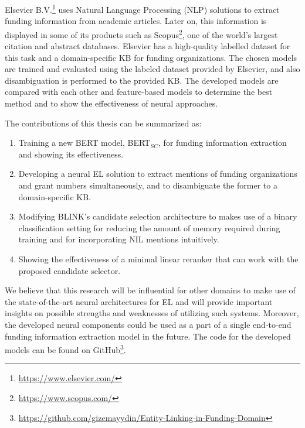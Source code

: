\documentclass{report}
\theoremstyle{definition}
\theoremstyle{remark}
\begin{document}
Elsevier B.V.\footnote{\url{https://www.elsevier.com/}} uses Natural Language Processing (NLP) solutions to extract funding information from academic articles. Later on, this information is displayed in some of its products such as Scopus\footnote{\url{https://www.scopus.com/}}, one of the world's largest citation and abstract databases. Elsevier has a high-quality labelled dataset for this task and a domain-specific KB for funding organizations. The chosen models are trained and evaluated using the labeled dataset provided by Elsevier, and also disambiguation is performed to the provided KB. The developed models are compared with each other and feature-based models to determine the best method and to show the effectiveness of neural approaches.

The contributions of this thesis can be summarized as:
\renewcommand{\labelenumi}{\arabic{enumi}.} 
\begin{enumerate}
    \item Training a new BERT model, BERT$_{SC}$, for funding information extraction and showing its effectiveness.
    \item Developing a neural EL solution to extract mentions of funding organizations and grant numbers simultaneously, and to disambiguate the former to a domain-specific KB. 
    \item Modifying BLINK's candidate selection architecture to makes use of a binary classification setting for reducing the amount of memory required during training and for incorporating NIL mentions intuitively.
    \item Showing the effectiveness of a minimal linear reranker that can work with the proposed candidate selector.
\end{enumerate}

We believe that this research will be influential for other domains to make use of the state-of-the-art neural architectures for EL and will provide important insights on possible strengths and weaknesses of utilizing such systems. Moreover, the developed neural components could be used as a part of a single end-to-end funding information extraction model in the future. The code for the developed models can be found on GitHub\footnote{\url{https://github.com/gizemayydin/Entity-Linking-in-Funding-Domain}}.
\end{document}
